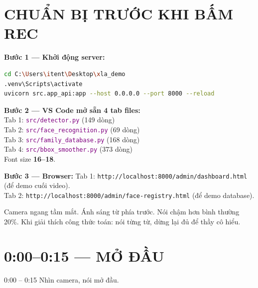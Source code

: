\documentclass[12pt, a4paper]{article}
\newcommand{\fpath}[1]{\texttt{\textcolor{purple}{#1}}}
\begin{document}
\tableofcontents\newpage

\section{CHUẨN BỊ TRƯỚC KHI BẤM REC}

\begin{doact}
\textbf{Bước 1 --- Khởi động server:}
\begin{lstlisting}[language=bash, numbers=none]
cd C:\Users\itent\Desktop\xla_demo
.venv\Scripts\activate
uvicorn src.app_api:app --host 0.0.0.0 --port 8000 --reload
\end{lstlisting}
\end{doact}

\begin{doact}
\textbf{Bước 2 --- VS Code mở sẵn 4 tab files:}\\
Tab 1: \fpath{src/detector.py} (149 dòng)\\
Tab 2: \fpath{src/face\_recognition.py} (69 dòng)\\
Tab 3: \fpath{src/family\_database.py} (168 dòng)\\
Tab 4: \fpath{src/bbox\_smoother.py} (373 dòng)\\
Font size \textbf{16--18}.
\end{doact}

\begin{doact}
\textbf{Bước 3 --- Browser:}
Tab 1: \texttt{http://localhost:8000/admin/dashboard.html} (để demo cuối video).\\
Tab 2: \texttt{http://localhost:8000/admin/face-registry.html} (để demo database).
\end{doact}

\begin{cam}
Camera ngang tầm mắt. Ánh sáng từ phía trước. Nói chậm hơn bình thường 20\%.
Khi giải thích công thức toán: nói từng từ, dừng lại đủ để thầy cô hiểu.
\end{cam}

\newpage
\section{0:00--0:15 --- MỞ ĐẦU}

\begin{timing}{0:00 -- 0:15}
Nhìn camera, nói mở đầu.
\end{timing}
\end{document}
